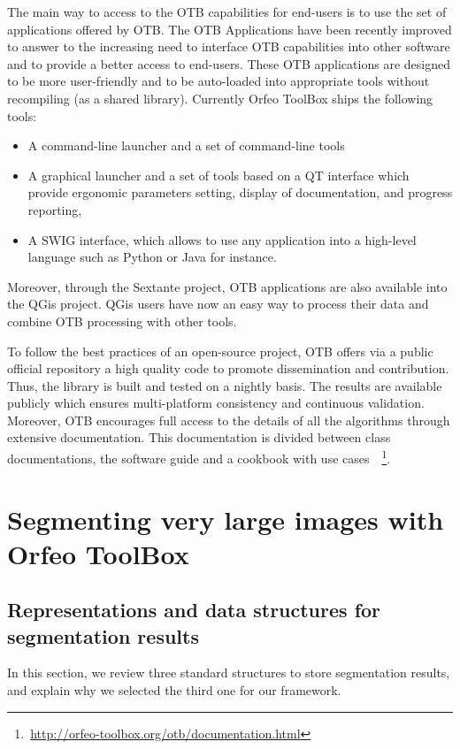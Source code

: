 \documentclass{josis}
\newcommand{\furl}[1]{    $\,$\footnote{$\,$\url{#1}}}
\begin{document}
The main way to access to the OTB capabilities for end-users is to use the set of applications offered by OTB. The OTB Applications have been recently improved to answer to the increasing need to interface OTB capabilities into other software and to provide a better access to end-users. These OTB applications are designed to be more user-friendly and to be auto-loaded into appropriate tools without recompiling (as a shared library). Currently Orfeo ToolBox ships the following tools:
\begin{itemize}
\item A command-line launcher and a set of command-line tools
\item A graphical launcher and a set of tools based on a QT interface which provide ergonomic parameters setting, display of documentation, and progress reporting,
\item A SWIG interface, which allows to use any application into a high-level language such as Python or Java for instance.
\end{itemize}
Moreover, through the Sextante project, OTB applications are also available into the QGis project. QGis users have now an easy way to process their data and combine OTB processing with other tools.  

To follow the best practices of an open-source project, OTB offers via a public official repository a high quality code to promote dissemination and contribution. Thus, the library is built and tested on a nightly basis. The results are available publicly which ensures multi-platform consistency and continuous validation. Moreover, OTB encourages full access to the details of all the algorithms through extensive documentation. This documentation is divided between class documentations, the software guide and a cookbook with use cases~\furl{http://orfeo-toolbox.org/otb/documentation.html}.

\section{Segmenting very large images with Orfeo ToolBox}


\subsection{Representations and data structures for segmentation results}

In this section, we review three standard structures to store
segmentation results, and explain why we selected the third one for
our framework.
\end{document}
